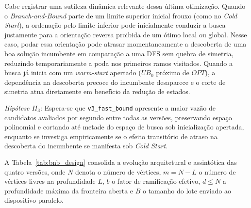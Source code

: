 Cabe registrar uma sutileza dinâmica relevante dessa última otimização. Quando o
\textit{Branch-and-Bound} parte de um limite superior inicial frouxo (como no \textit{Cold
Start}), a ordenação pelo limite inferior pode inicialmente conduzir a busca justamente para a
orientação reversa proibida de um ótimo local ou global. Nesse caso, podar essa orientação pode
atrasar momentaneamente a descoberta de uma boa solução incumbente em comparação a uma DFS sem
quebra de simetria, reduzindo temporariamente a poda nos primeiros ramos visitados. Quando a
busca já inicia com um \textit{warm-start} apertado ($UB_0$ próximo de $OPT$), a dependência na
descoberta precoce do incumbente desaparece e o corte de simetria atua diretamente em benefício
da redução de estados.

\textit{Hipótese $H_3$}: Espera-se que \texttt{v3\_fast\_bound} apresente a maior vazão de
candidatos avaliados por segundo entre todas as versões, preservando espaço polinomial e
cortando até metade do espaço de busca sob inicialização apertada, enquanto se investiga
empiricamente se o efeito transitório de atraso na descoberta do incumbente se manifesta sob
\textit{Cold Start}.

A Tabela~\ref{tab:bnb_design} consolida a evolução arquitetural e assintótica das quatro
versões, onde $N$ denota o número de vértices, $m = N - L$ o número de vértices livres na
profundidade $L$, $b$ o fator de ramificação efetivo, $d \le N$ a profundidade máxima da
fronteira aberta e $B$ o tamanho do lote enviado ao dispositivo paralelo.

\begin{table}[htbp]
  \centering
  \caption{Evolução arquitetural e expectativas assintóticas das quatro versões graduais do \textit{Branch-and-Bound}.}
  \label{tab:bnb_design}
  \scriptsize
\end{table}
